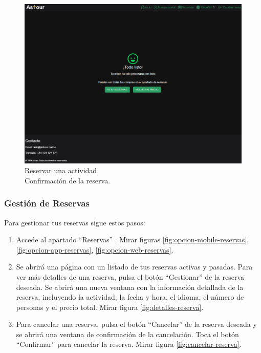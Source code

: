 \begin{figure}[H]
\begin{minipage}{0.45\textwidth}
		\includegraphics[width=1\textwidth]{7-Construccion/Manuales/web/thankYou.png}
		\caption{Reservar una actividad \\ Confirmación de la reserva.}
		\label{fig:confirmacion-reserva}
	\end{minipage}
\end{figure}


\subsubsection{Gestión de Reservas}
Para gestionar tus reservas sigue estos pasos:
\begin{enumerate}
	\item Accede al apartado “Reservas” . Mirar figuras \ref{fig:opcion-mobile-reservas}, \ref{fig:opcion-app-reservas}, \ref{fig:opcion-web-reservas}.

	\item Se abrirá una página con un listado de tus reservas activas y pasadas.
	      Para ver más detalles de una reserva, pulsa el botón “Gestionar” de la reserva deseada.
	      Se abrirá una nueva ventana con la información detallada de la reserva, incluyendo la actividad, la fecha y hora, el idioma, el número de personas y el precio total.
	      Mirar figura \ref{fig:detalles-reserva}.

	\item Para cancelar una reserva, pulsa el botón “Cancelar” de la reserva deseada y se abrirá una ventana de confirmación de la cancelación.
	      Toca el botón “Confirmar” para cancelar la reserva. Mirar figura \ref{fig:cancelar-reserva}.

\end{enumerate}

